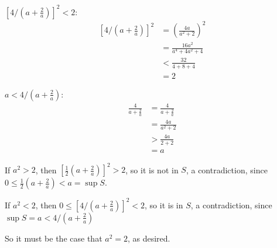 \documentclass[11pt]{article}
\begin{document}
\noindent
\underline{$\left[4/\left(a+\frac{2}{a}\right)\right]^2<2$}:
\begin{align*}
	\left[4/\left(a+\frac{2}{a}\right)\right]^2
	&=\left(\frac{4a}{a^2+2}\right)^2\\
	&=\frac{16a^2}{a^4+4a^2+4}\\
	&<\frac{32}{4+8+4}\\
	&=2
\end{align*}

\noindent
\underline{$a<4/\left(a+\frac{2}{a}\right)$}:
\begin{align*}
	\frac{4}{a+\frac{2}{a}}
	&=\frac{4}{a+\frac{2}{a}}\\
	&=\frac{4a}{a^2+2}\\
	&>\frac{4a}{2+2}\\
	&=a
\end{align*}

\noindent
If $a^2>2$, then $\left[\frac{1}{2}\left(a+\frac{2}{a}\right)\right]^2>2$, so it is not in $S$, a contradiction, since $0\le\frac{1}{2}\left(a+\frac{2}{a}\right)<a=\sup S$.

\noindent
If $a^2<2$, then $0\le\left[4/\left(a+\frac{2}{a}\right)\right]^2<2$, so it is in $S$, a contradiction, since $\sup S=a<4/\left(a+\frac{2}{a}\right)$

\noindent
So it must be the case that $a^2=2$, as desired.
\end{document}
